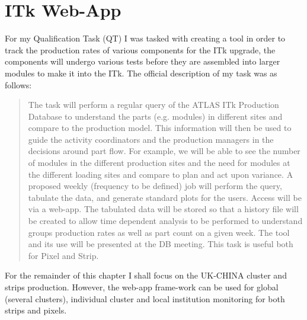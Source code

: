 \section{ITk Web-App}
For my Qualification Task (QT) I was tasked with creating a tool in order to track the production rates of various components for the ITk upgrade, the components will undergo various tests before they are assembled into larger modules to make it into the ITk. The official description of my task was as follows:

\begin{quote}
    The task will perform a regular query of the ATLAS ITk Production Database to understand the parts (e.g. modules) in different sites and compare to the production model. This information will then be used to guide the activity coordinators and the production managers in the decisions around part flow. For example, we will be able to see the number of modules in the different production sites and the need for modules at the different loading sites and compare to plan and act upon variance. A proposed weekly (frequency to be defined) job will perform the query, tabulate the data, and generate standard plots for the users. Access will be via a web-app. The tabulated data will be stored so that a history file will be created to allow time dependent analysis to be performed to understand groups production rates as well as part count on a given week. The tool and its use will be presented at the DB meeting. This task is useful both for Pixel and Strip.
    
\end{quote}
For the remainder of this chapter I shall focus on the UK-CHINA cluster and strips production. However, the web-app frame-work can be used for global (several clusters), individual cluster and local institution monitoring for both strips and pixels. 
